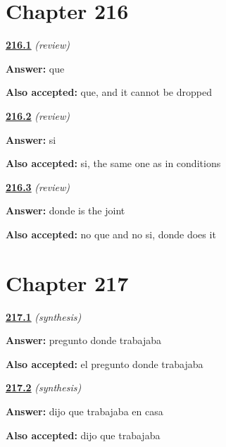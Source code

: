 \section*{Chapter 216}

\noindent\begin{minipage}[t]{\linewidth}
\raggedright
\hyperlink{review-ES-C57-repaso-reportar-que}{\textbf{216.1}} \emph{(review)}\par
\small \textbf{Answer:} que\par
\footnotesize \textbf{Also accepted:} que, and it cannot be dropped
\end{minipage}\par\medskip

\noindent\begin{minipage}[t]{\linewidth}
\raggedright
\hyperlink{review-ES-C57-repaso-reportar-si}{\textbf{216.2}} \emph{(review)}\par
\small \textbf{Answer:} si\par
\footnotesize \textbf{Also accepted:} si, the same one as in conditions
\end{minipage}\par\medskip

\noindent\begin{minipage}[t]{\linewidth}
\raggedright
\hyperlink{review-ES-C57-repaso-reportar-wh}{\textbf{216.3}} \emph{(review)}\par
\small \textbf{Answer:} donde is the joint\par
\footnotesize \textbf{Also accepted:} no que and no si, donde does it
\end{minipage}\par\medskip

\section*{Chapter 217}

\noindent\begin{minipage}[t]{\linewidth}
\raggedright
\hyperlink{review-ES-C57-sintesis-reportar-one}{\textbf{217.1}} \emph{(synthesis)}\par
\small \textbf{Answer:} pregunto donde trabajaba\par
\footnotesize \textbf{Also accepted:} el pregunto donde trabajaba
\end{minipage}\par\medskip

\noindent\begin{minipage}[t]{\linewidth}
\raggedright
\hyperlink{review-ES-C57-sintesis-reportar-two}{\textbf{217.2}} \emph{(synthesis)}\par
\small \textbf{Answer:} dijo que trabajaba en casa\par
\footnotesize \textbf{Also accepted:} dijo que trabajaba
\end{minipage}\par\medskip

